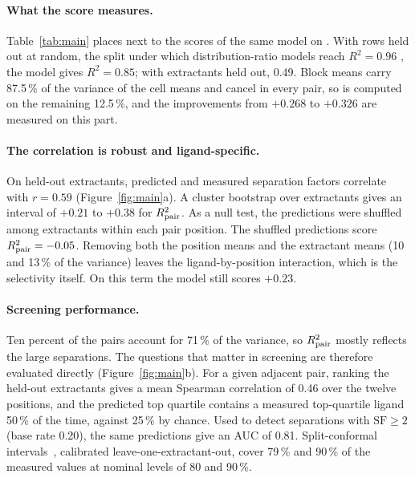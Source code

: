 \paragraph{What the score measures.}
Table~\ref{tab:main} places \adjR{} next to the scores of the same model on \logD{}. With rows held out at random, the split under which distribution-ratio models reach $R^2 = 0.96$ \citep{liu2026}, the model gives $R^2 = 0.85$; with extractants held out, 0.49. Block means carry 87.5\,\% of the variance of the cell means and cancel in every pair, so \adjR{} is computed on the remaining 12.5\,\%, and the improvements from $+0.268$ to $+0.326$ are measured on this part.

\paragraph{The correlation is robust and ligand-specific.}
On held-out extractants, predicted and measured separation factors correlate with $r = 0.59$ (Figure~\ref{fig:main}a). A cluster bootstrap over extractants gives an interval of $+0.21$ to $+0.38$ for $R^2_{\mathrm{pair}}$. As a null test, the predictions were shuffled among extractants within each pair position. The shuffled predictions score $R^2_{\mathrm{pair}} = -0.05$. Removing both the position means and the extractant means (10 and 13\,\% of the variance) leaves the ligand-by-position interaction, which is the selectivity itself. On this term the model still scores $+0.23$.

\paragraph{Screening performance.}
Ten percent of the pairs account for 71\,\% of the variance, so $R^2_{\mathrm{pair}}$ mostly reflects the large separations. The questions that matter in screening are therefore evaluated directly (Figure~\ref{fig:main}b). For a given adjacent pair, ranking the held-out extractants gives a mean Spearman correlation of 0.46 over the twelve positions, and the predicted top quartile contains a measured top-quartile ligand 50\,\% of the time, against 25\,\% by chance. Used to detect separations with $\mathrm{SF} \geq 2$ (base rate 0.20), the same predictions give an AUC of 0.81. Split-conformal intervals~\citep{vovk2005}, calibrated leave-one-extractant-out, cover 79\,\% and 90\,\% of the measured values at nominal levels of 80 and 90\,\%.

